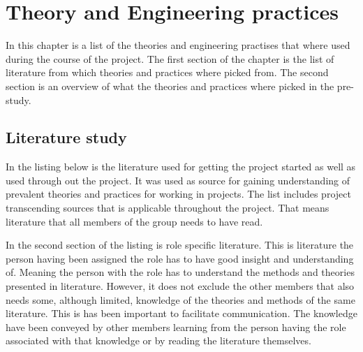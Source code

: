 \section{Theory and Engineering practices}
In this chapter is a list of the theories and engineering practises that where used during the course of the project. The first section of the chapter is the list of literature from which theories and practices where picked from. The second section is an overview of what the theories and practices where picked in the pre-study.  
\subsection{Literature study}
In the listing below is the literature used for getting the project started as well as used through out the project. It was used as source for gaining understanding of prevalent theories and practices for working in projects. The list includes project transcending sources that is applicable throughout the project. That means literature that all members of the group needs to have read. 

In the second section of the listing is role specific literature. This is literature the person having been assigned the role has to have good insight and understanding of. Meaning the person with the role has to understand the methods and theories presented in literature. However, it does not exclude the other members that also needs some, although limited, knowledge of the theories and methods of the same literature. This is has been important to facilitate communication. The knowledge have been conveyed by other members learning from the person having the role associated with that knowledge or by reading the literature themselves.            

\vspace{5mm} %


